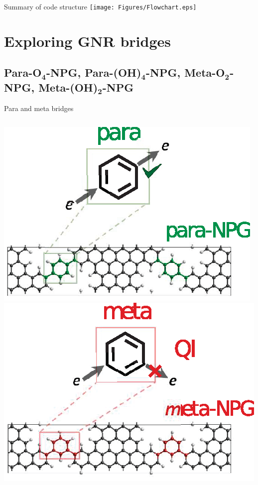 \documentclass[hyperref={colorlinks=true,urlcolor=blue,linkcolor=.},aspectratio=1610,mathserif]{beamer}
\newcommand*\mathinhead[2]{\texorpdfstring{$\boldsymbol{#1}$}{#2}}
\begin{document}
\begin{frame}{Summary of code structure}
	\centering
	\texttt{[image: Figures/Flowchart.eps]}
\end{frame}

\section{Exploring GNR bridges}
\subsection{Para-O\mathinhead{_4}{_4}-NPG, Para-(OH)\mathinhead{_4}{_4}-NPG, Meta-O\mathinhead{_2}{_2}-NPG, Meta-(OH)\mathinhead{_2}{_2}-NPG}

\begin{frame}{Para and meta bridges}
	\centering
	\begin{overprint}
		\centering
		\begin{columns}[t]
			\includegraphics[height=.7\textwidth]{Figures/Parametagraphic.eps}
			\includegraphics[height=.7\textwidth]{Figures/Metaparagraphic.eps}

\end{columns}
\end{overprint}
\end{frame}
\end{document}

